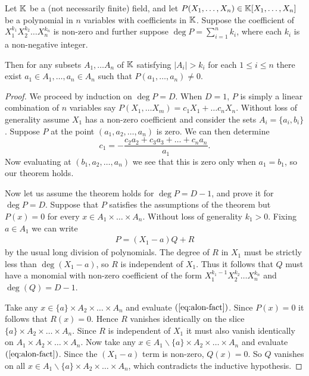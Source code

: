 \begin{theorem}
    Let $\mathbb K$ be a (not necessarily finite) field, and let $P(X_1,\dots, X_n) \in \mathbb K[X_1,\dots, X_n]$ be a polynomial in $n$ variables with coefficients in $\mathbb K$. Suppose the coefficient of $X_1^{k_1}X_2^{k_2}\dots X_n^{k_n}$ is non-zero and further suppose $\deg P = \sum_{i=1}^n k_i$, where each $k_i$ is a non-negative integer.

    Then for any subsets $A_1,\dots A_n$ of $\mathbb K$ satisfying $|A_i| > k_i$ for each $1\leq i\leq n$ there exist $a_1 \in A_1, \dots, a_n \in A_n$ such that $P(a_1,\dots, a_n) \neq 0$.
    \label{thm:comb-nullstellensatz}
\end{theorem}
\begin{proof}
    We proceed by induction on $\deg P = D$. When $D=1$, $P$ is simply a linear combination of $n$ variables say $P(X_1,\dots X_m) = c_1 X_1 + \dots c_n X_n$. Without loss of generality assume $X_1$ has a non-zero coefficient and consider the sets $A_i = \{a_{i}, b_{i}\}$. Suppose $P$ at the point $(a_{1}, a_{2}, \dots, a_{n})$ is zero. We can then determine 
    \[c_{1} =- \frac{c_2 a_{2} + c_3 a_{3}+\dots+ c_n a_{n}}{a_{1}}.\] 
    Now evaluating at $(b_1, a_{2}, \dots, a_{n})$ we see that this is zero only when $a_{1} = b_{1}$, so our theorem holds. 

    
    Now let us assume the theorem holds for $\deg P = D -1$, and prove it for $\deg P = D$.
    Suppose that $P$ satisfies the assumptions of the theorem but $P(x) = 0$ for every $x \in A_1 \times \dots \times A_n$.
    Without loss of generality $k_1 > 0.$ Fixing $a\in A_1$ we can write
    \begin{align}
        P = (X_1-a)Q +R \label{eq:alon-fact}
    \end{align}
    by the usual long division of polynomials. The degree of $R$ in $X_1$ must be strictly less than $\deg(X_1-a)$, so $R$ is independent of $X_1$. Thus it follows that $Q$ must have a monomial with non-zero coefficient of the form $X_1^{k_{1} -1} X_2^{k_2} \dots X_n^{k_n}$ and 
    $\deg (Q) = D-1$.

    Take any $x \in \{a\} \times A_2 \times \dots \times A_n$ and evaluate $(\ref{eq:alon-fact})$. Since $P(x) = 0$ it follows that $R(x) = 0$. Hence $R$ vanishes identically on the slice $\{a\} \times A_2 \times \dots \times A_n$. Since $R$ is independent of $X_1$ it must also vanish identically on $A_1 \times A_2 \times \dots \times A_n$.
    Now take any $x \in A_1 \backslash \{a\} \times A_2 \times \dots \times A_n$ and evaluate $(\ref{eq:alon-fact})$. Since the $(X_1 - a)$ term is non-zero, $Q(x) =0$. So $Q$ vanishes on all $x \in A_1 \backslash \{a\} \times A_2 \times \dots \times A_n$, which contradicts the inductive hypothesis.
\end{proof}
